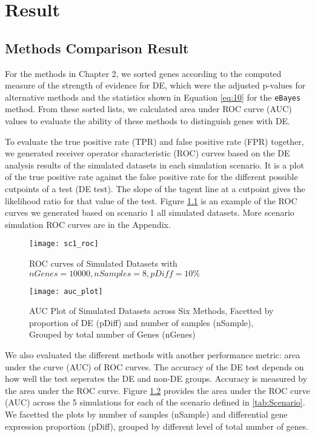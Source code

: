 \chapter{Result}

\section{Methods Comparison Result}

For the methods in Chapter 2, we sorted genes according to the computed measure of the strength of evidence for DE, which were the adjusted p-values for alternative methods and the statistics shown in Equation \eqref{eq:10} for the \texttt{eBayes} method. From these sorted lists, we calculated area under ROC curve (AUC) values to evaluate the ability of these methods to distinguish genes with DE. 

To evaluate the true positive rate (TPR) and false positive rate (FPR) together, we generated receiver operator characteristic (ROC) curves based on the DE analysis results of the simulated datasets in each simulation scenario. It is a plot of the true positive rate against the false positive rate for the different possible cutpoints of a test (DE test). The slope of the tagent line at a cutpoint gives the likelihood ratio for that value of the test. Figure \ref{sc1_roc} is an example of the ROC curves we generated based on scenario 1 all simulated datasets. More scenario simulation ROC curves are in the Appendix. 

\begin{figure}[h!tb] 
\texttt{[image: sc1\_roc]}
\caption{ROC curves of Simulated Datasets with $nGenes=10000, nSamples=8, pDiff=10\%$}
\label{sc1_roc}
\end{figure}


\begin{figure}[h!tb] 
\texttt{[image: auc\_plot]}
\caption{AUC Plot of Simulated Datasets across Six Methods, Facetted by proportion of DE (pDiff) and number of samples (nSample), Grouped by total number of Genes (nGenes)}
\label{auc}
\end{figure}


We also evaluated the different methods with another performance metric: area under the curve (AUC) of ROC curves. The accuracy of the DE test depends on how well the test seperates the DE and non-DE groups. Accuracy is measured by the area under the ROC curve. Figure \ref{auc} provides the area under the ROC curve (AUC) across the 5 simulations for each of the scenario defined in \ref{tab:Scenario}. We facetted the plots by number of samples (nSample) and differential gene expression proportion (pDiff), grouped by different level of total number of genes. 


